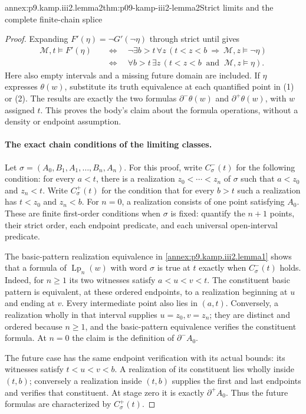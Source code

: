 \begin{annexitem}{annex:p9.kamp.iii2.lemma2}{thm:p09-kamp-iii2-lemma2}{Strict limits and the complete finite-chain splice}
\begin{proof}
Expanding \(F'(\eta)=\neg G'(\neg\eta)\) through strict until gives
\[
\begin{split}
 \mathcal M,t\models F'(\eta)
 &\quad\Longleftrightarrow\quad
 \neg\exists b>t\,\forall z\,
       (t<z<b\ \Rightarrow\ \mathcal M,z\models\neg\eta)\\
 &\quad\Longleftrightarrow\quad
 \forall b>t\,\exists z\,
       (t<z<b\ \text{ and }\ \mathcal M,z\models\eta).
\end{split}
\tag{2}
\]
Here also empty intervals and a missing future domain are included.
If \(\eta\) expresses \(\theta(w)\), substitute its truth equivalence
at each quantified point in (1) or (2).  The results are exactly the two
formulas \(\partial^-\theta(w)\) and \(\partial^+\theta(w)\), with
\(w\) assigned \(t\).  This proves the body's claim about the formula
operations, without a density or endpoint assumption.

\paragraph{The exact chain conditions of the limiting classes.}
Let \(\sigma=(A_0,B_1,A_1,\ldots,B_n,A_n)\).  For this proof, write
\(C^-_\sigma(t)\) for the following condition: for every \(a<t\),
there is a realization \(z_0<\cdots<z_n\) of \(\sigma\) such that
\(a<z_0\) and \(z_n<t\).  Write \(C^+_\sigma(t)\) for the condition
that for every \(b>t\) such a realization has \(t<z_0\) and \(z_n<b\).
For \(n=0\), a realization consists of one point satisfying \(A_0\).
These are finite first-order conditions when \(\sigma\) is fixed:
quantify the \(n+1\) points, their strict order, each endpoint predicate,
and each universal open-interval predicate.

The basic-pattern realization equivalence in
\cref{annex:p9.kamp.iii2.lemma1} shows that a formula of
\(\operatorname{Lp}_n(w)\) with word \(\sigma\) is true at \(t\)
exactly when \(C^-_\sigma(t)\) holds.  Indeed, for \(n\geq1\) its
two witnesses satisfy \(a<u<v<t\).  The constituent basic pattern is
equivalent, at these ordered endpoints, to a realization beginning at
\(u\) and ending at \(v\).  Every intermediate point also lies in
\((a,t)\).  Conversely, a realization wholly in that interval supplies
\(u=z_0,v=z_n\); they are distinct and ordered because \(n\geq1\),
and the basic-pattern equivalence verifies the constituent formula.
At \(n=0\) the claim is the definition of \(\partial^-A_0\).

The future case has the same endpoint verification with its actual bounds:
its witnesses satisfy \(t<u<v<b\).  A realization of its constituent
lies wholly inside \((t,b)\); conversely a realization inside \((t,b)\)
supplies the first and last endpoints and verifies that constituent.  At
stage zero it is exactly \(\partial^+A_0\).  Thus the future formulas
are characterized by \(C^+_\sigma(t)\).


\end{proof}
\end{annexitem}
